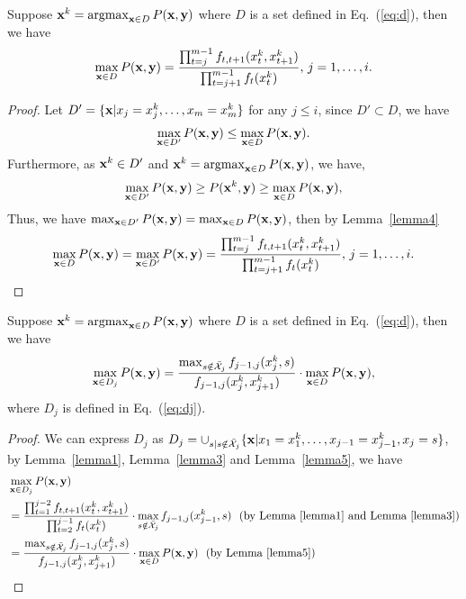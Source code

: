 \begin{lemma}
\label{lemma6}
Suppose $\mathbf{x}^k = \operatorname*{argmax}_{\mathbf{x} \in D} P(\mathbf{x},\mathbf{y})$ where $D$ is a set defined in Eq.~(\ref{eq:d}),
then we have
\begin{equation*}
\max_{\mathbf{x} \in D} P(\mathbf{x},\mathbf{y}) = \frac{\prod_{t=j}^{m-1} f_{t,t+1}(x_t^k, x_{t+1}^k)} {\prod_{t=j+1}^{m-1} f_t(x_t^k)},
\, j = 1, \dots, i.
\end{equation*}
\end{lemma}

\begin{proof}
Let $D' = \{\mathbf{x} |x_j = x_j^k, \dots, x_m = x_m^k \}$ for any $j \le i$,
since $D' \subset D$, we have
\begin{equation*}
\max_{\mathbf{x} \in D'} P(\mathbf{x},\mathbf{y}) \le \max_{\mathbf{x} \in D} P(\mathbf{x},\mathbf{y}).
\end{equation*}
Furthermore, as $\mathbf{x}^k \in D'$ and $\mathbf{x}^k = \operatorname*{argmax}_{\mathbf{x} \in D} P(\mathbf{x},\mathbf{y})$,
we have,
\begin{equation*}
\max_{\mathbf{x} \in D'} P(\mathbf{x},\mathbf{y}) \ge P(\mathbf{x}^k,\mathbf{y}) \ge \max_{\mathbf{x} \in D} P(\mathbf{x},\mathbf{y}),
\end{equation*}
Thus, we have $\max_{\mathbf{x} \in D'} P(\mathbf{x},\mathbf{y}) = \max_{\mathbf{x} \in D} P(\mathbf{x},\mathbf{y})$,
then by Lemma~\ref{lemma4}
\begin{equation*}
\max_{\mathbf{x} \in D} P(\mathbf{x},\mathbf{y}) = \max_{\mathbf{x} \in D'} P(\mathbf{x},\mathbf{y}) 
= \frac{\prod_{t=j}^{m-1} f_{t,t+1}(x_t^k, x_{t+1}^k)} {\prod_{t=j+1}^{m-1} f_t(x_t^k)},
\, j = 1, \dots, i.
\end{equation*}
\end{proof}

\begin{theorem}
\label{theorem3}
Suppose $\mathbf{x}^k = \operatorname*{argmax}_{\mathbf{x} \in D} P(\mathbf{x},\mathbf{y})$ where $D$ is a set defined in Eq.~(\ref{eq:d}),
then we have
\begin{equation*}
\max_{\mathbf{x} \in D_j} P(\mathbf{x},\mathbf{y}) 
= \frac{\max_{s \notin \bar{\mathcal{X}}_j} f_{j-1,j}(x_j^k,s)} {f_{j-1,j}(x_j^k,x_{j+1}^k)}
  \cdot \max_{\mathbf{x} \in D} P(\mathbf{x},\mathbf{y}),
\end{equation*}
where $D_j$ is defined in Eq.~(\ref{eq:dj}). 
\end{theorem}

\begin{proof}
We can express $D_j$ as 
$D_j = \cup_{s |s \notin \bar{\mathcal{X}}_j} \{\mathbf{x} |x_1 = x_1^k, \dots, x_{j-1} = x_{j-1}^k, x_j = s\}$,
by Lemma~\ref{lemma1}, Lemma~\ref{lemma3} and Lemma~\ref{lemma5}, we have
\begin{align*}
&\max_{\mathbf{x} \in D_j} P(\mathbf{x},\mathbf{y}) \\
&= \frac{\prod_{t=1}^{j-2} f_{t,t+1}(x_t^k,x_{t+1}^k)} {\prod_{t=2}^{j-1} f_t(x_t^k)}
   \cdot \max_{s \notin \bar{\mathcal{X}}_j} f_{j-1,j}(x_{j-1}^k, s)
~~\text{(by Lemma~\ref{lemma1} and Lemma~\ref{lemma3})} \\
&= \frac{\max_{s \notin \bar{\mathcal{X}}_j} f_{j-1,j}(x_j^k,s)} {f_{j-1,j}(x_j^k,x_{j+1}^k)}
   \cdot \max_{\mathbf{x} \in D} P(\mathbf{x},\mathbf{y})
~~\text{(by Lemma~\ref{lemma5})}
\end{align*}
\end{proof}
